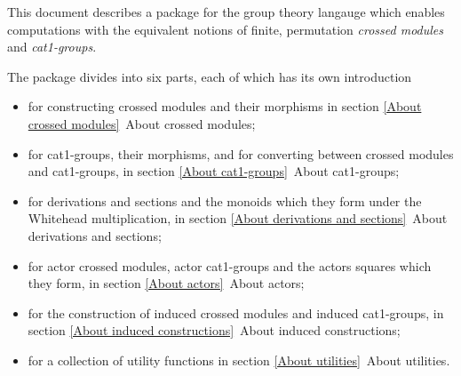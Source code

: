 
\newcommand{\semidirect}{\hspace{0.3em}\rule[0.03em]{0.05em}{0.45em}
                         \hspace{-0.35em}  \times  }


%


This document describes a package for the {\GAP}
group theory langauge which enables computations with the 
equivalent notions of finite, permutation
{\em crossed modules} and {\em cat1-groups}.

The package divides into six parts, each of which has its own introduction\:
\begin{itemize}
\item for constructing crossed modules and their morphisms in section 
      \ref{About crossed modules}\:\ About crossed modules;
\item for cat1-groups, their morphisms, and for converting between
      crossed modules and cat1-groups, 
      in section \ref{About cat1-groups}\:\ About cat1-groups;
\item for derivations and sections and the monoids which they form
      under the Whitehead multiplication, in section
      \ref{About derivations and sections}\:\ About derivations and sections;
\item for actor crossed modules, actor cat1-groups and the actors squares
      which they form,  in section \ref{About actors}\:\ About actors;
\item for the construction of induced crossed modules
      and induced cat1-groups, in section 
      \ref{About induced constructions}\:\ About induced constructions;
\item for a collection of utility functions in section 
      \ref{About utilities}\:\ About utilities.
\end{itemize}

